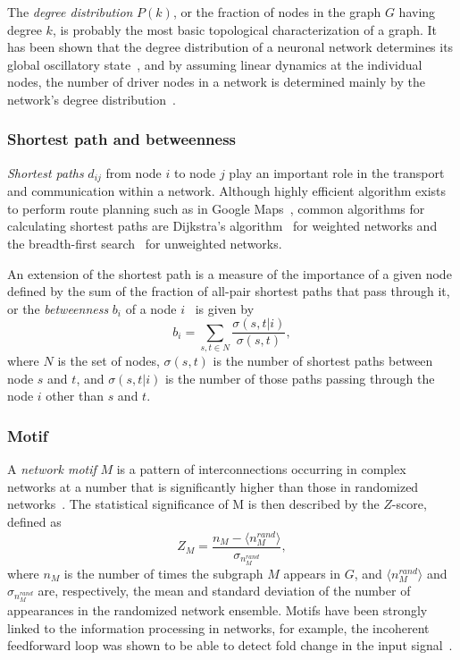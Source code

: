 The \emph{degree distribution} $P(k)$, or the fraction of nodes in the graph 
$G$ having degree $k$, is probably the most basic topological 
characterization of a graph. It has been shown that the degree distribution of
a neuronal network determines its global oscillatory state~\citep{Roxin2011}, 
and by assuming linear dynamics at the individual nodes, 
the number of driver nodes in a network is determined mainly by the 
network's degree distribution~\citep{Liu2011}.

\subsubsection{Shortest path and betweenness}
\label{sec:shortest_path}
\emph{Shortest paths} $d_{ij}$ from node $i$ to node $j$ play an important 
role in the transport and communication 
within a network. Although highly efficient algorithm exists to perform
route planning such as in Google Maps~\citep{Sanders2005}, common algorithms
for calculating shortest paths are Dijkstra's algorithm~\citep{Dijkstra1959} for weighted networks
and the breadth-first search~\citep{West2000} for unweighted networks.

An extension of the shortest path is a measure of the importance of a given 
node defined by the sum of the fraction of all-pair shortest paths that pass 
through it, or the 
\emph{betweenness} $b_i$ of a node $i$~\citep{Freeman1977} is given by
\begin{equation}
b_i = \sum_{s,t \in N} \frac{\sigma(s,t|i)}{\sigma(s,t)},
\end{equation}
where $N$ is the set of nodes, $\sigma(s,t)$ is the number of shortest paths 
between node $s$ and $t$, and $\sigma(s,t|i)$ is the number of those paths 
passing through the node $i$ other than $s$ and $t$.

\subsubsection{Motif}
A \emph{network motif} $M$ is a pattern of interconnections occurring in complex 
networks at a number that is significantly higher than those in randomized 
networks~\citep{Milo2002,Shen-Orr2002}. The statistical significance of M is 
then described by the $Z$-score, defined as
\begin{equation}
Z_M = \frac{n_M - \langle n_M^{rand} \rangle}{\sigma_{n_M^{rand}}},
\end{equation}
where $n_M$ is the number of times the subgraph $M$ appears in $G$, and 
$\langle n_M^{rand} \rangle$ and $\sigma_{n_M^{rand}}$ are, respectively, 
the mean and 
standard deviation of the number of appearances in the randomized network ensemble.
Motifs have been strongly linked to the information processing in networks, 
for example, the incoherent feedforward loop was shown to be able to detect
fold change in the input signal~\citep{Goentoro2009}.

